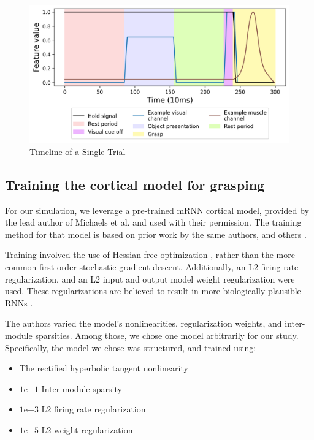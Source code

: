 \documentclass[12pt]{iopart}
\begin{document}
\begin{figure}[h!]
\centering
\includegraphics[scale=0.7]{trial_timeline.png}
\caption{Timeline of a Single Trial}
\label{fig:trial_timeline}
\end{figure}

\subsection{Training the cortical model for grasping}
\label{sup:michaelstraining}

For our simulation, we leverage a pre-trained mRNN cortical model, provided by the
lead author of Michaels et al. \cite{michaels.mrnn} and used with their permission.
The training method for that model is based on prior work by the same authors, and
others \cite{sussillo.mrnn}.

Training involved the use of Hessian-free optimization \cite{martens.hessianfree},
rather than the more common first-order stochastic gradient descent. Additionally, an L2 firing
rate regularization, and an L2 input and output model weight regularization were used.
These regularizations are believed to result in more biologically plausible RNNs \cite{kao.sim}.

The authors varied the model's nonlinearities, regularization weights, and
inter-module sparsities. Among those, we chose one model arbitrarily for our study. Specifically,
the model we chose was structured, and trained using:

\begin{itemize}
    \item The rectified hyperbolic tangent nonlinearity
    \item $1\mathrm{e}{-1}$ Inter-module sparsity
    \item $1\mathrm{e}{-3}$ L2 firing rate regularization
    \item $1\mathrm{e}{-5}$ L2 weight regularization
\end{itemize}
\end{document}

